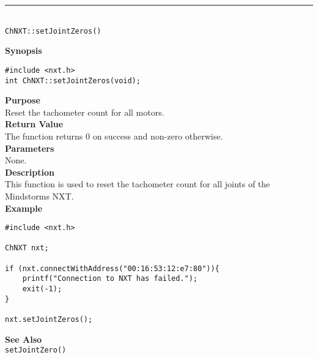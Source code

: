 \noindent
\vspace{5pt}
\rule{4.5in}{0.015in}\\
\noindent
{\LARGE \texttt{ChNXT::setJointZeros()} }\\


\noindent
{\bf Synopsis}
\vspace{-8pt}
\begin{verbatim}
#include <nxt.h>
int ChNXT::setJointZeros(void);
\end{verbatim}

\noindent
{\bf Purpose}\\
Reset the tachometer count for all motors.\\

\noindent
{\bf Return Value}\\
The function returns 0 on success and non-zero otherwise.\\

\noindent
{\bf Parameters}\\
None.\\

\noindent
{\bf Description}\\
This function is used to reset the tachometer count for 
all joints of the Mindstorms NXT.\\

\noindent
{\bf Example}
\begin{verbatim}
#include <nxt.h> 

ChNXT nxt;

if (nxt.connectWithAddress("00:16:53:12:e7:80")){
    printf("Connection to NXT has failed.");
    exit(-1);
}
    
nxt.setJointZeros();
\end{verbatim}

\noindent
{\bf See Also}\\
\texttt{setJointZero()}\\
